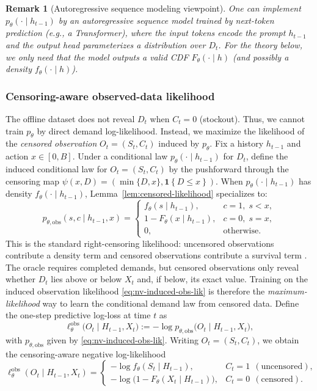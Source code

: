 \documentclass[11pt]{article}
\DeclarePairedDelimiter{\ind}{\mathbf{1}\{}{\}}
\newtheorem{remark}{Remark}
\providecommand{\ind}[1]{\mathbf{1}\!\left\{#1\right\}}
\begin{document}
\begin{remark}[Autoregressive sequence modeling viewpoint]
One can implement $p_\theta(\cdot\mid h_{t-1})$ by an autoregressive sequence model trained by next-token
prediction (e.g., a Transformer), where the input tokens encode the prompt $h_{t-1}$ and the output head
parameterizes a distribution over $D_t$.
For the theory below, we only need that the model outputs a valid CDF $F_\theta(\cdot\mid h)$ (and possibly a
density $f_\theta(\cdot\mid h)$).
\end{remark}

\subsubsection{Censoring-aware observed-data likelihood}

The offline dataset does not reveal $D_t$ when $C_t=0$ (stockout). Thus, we cannot train $p_\theta$
by direct demand log-likelihood. Instead, we maximize the likelihood of the \emph{censored observation}
$O_t=(S_t,C_t)$ induced by $p_\theta$. Fix a history $h_{t-1}$ and action $x\in[0,B]$.
Under a conditional law $p_\theta(\cdot\mid h_{t-1})$ for $D_t$, define the induced conditional law for
$O_t=(S_t,C_t)$ by the pushforward through the censoring map
\(
\psi(x,D)=(\min\{D,x\},\ind{D\le x}).
\)
When $p_\theta(\cdot\mid h_{t-1})$ has density $f_\theta(\cdot\mid h_{t-1})$, Lemma~\ref{lem:censored-likelihood}
specializes to:
\begin{equation}
\label{eq:nv-induced-obs-lik}
p_{\theta,\mathrm{obs}}(s,c\mid h_{t-1},x)
=
\begin{cases}
f_\theta(s\mid h_{t-1}), & c=1,\; s<x,\\[2pt]
1-F_\theta(x\mid h_{t-1}), & c=0,\; s=x,\\[2pt]
0, & \text{otherwise.}
\end{cases}
\end{equation}
This is the standard right-censoring likelihood: uncensored observations contribute a density term and
censored observations contribute a survival term \citep{kaplan1958nonparametric,kalbfleisch2002,klein1997}. The oracle requires completed demands, but censored observations only reveal whether $D_t$ lies above or below $X_t$ and, if below, its exact value. Training on the induced observation likelihood \eqref{eq:nv-induced-obs-lik} is therefore the
\emph{maximum-likelihood} way to learn the conditional demand law from censored data. Define the one-step predictive log-loss at time $t$ as
\begin{equation}
\label{eq:nv-one-step-nll}
\ell^{\mathrm{obs}}_\theta\bigl(O_t\mid H_{t-1},X_t\bigr)
:=
-\log p_{\theta,\mathrm{obs}}\bigl(O_t\mid H_{t-1},X_t\bigr),
\end{equation}
with $p_{\theta,\mathrm{obs}}$ given by \eqref{eq:nv-induced-obs-lik}. Writing $O_t=(S_t,C_t)$, we obtain the censoring-aware negative log-likelihood
\[
\ell^{\mathrm{obs}}_\theta(O_t\mid H_{t-1},X_t)
=
\begin{cases}
-\log f_\theta(S_t\mid H_{t-1}), & C_t=1\ \ (\text{uncensored}),\\[2pt]
-\log\bigl(1-F_\theta(X_t\mid H_{t-1})\bigr), & C_t=0\ \ (\text{censored}).
\end{cases}
\]
\end{document}
